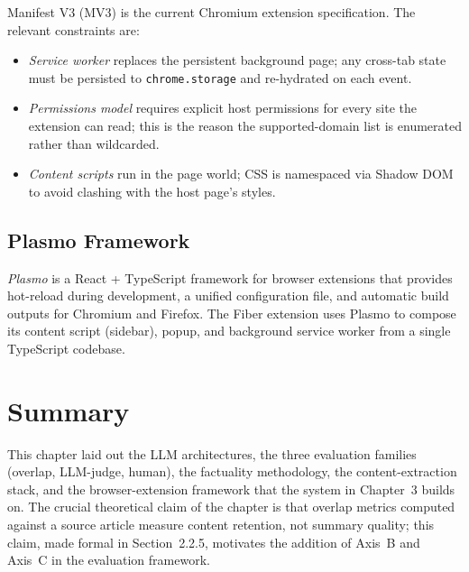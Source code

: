 Manifest V3 (MV3) is the current Chromium extension specification. The
relevant constraints are:

\begin{itemize}
  \item \textit{Service worker} replaces the persistent background page;
        any cross-tab state must be persisted to \texttt{chrome.storage}
        and re-hydrated on each event.
  \item \textit{Permissions model} requires explicit host permissions for
        every site the extension can read; this is the reason the
        supported-domain list is enumerated rather than wildcarded.
  \item \textit{Content scripts} run in the page world; CSS is namespaced
        via Shadow DOM to avoid clashing with the host page's styles.
\end{itemize}

\subsection{Plasmo Framework}

\textit{Plasmo} is a React + TypeScript framework for browser extensions
that provides hot-reload during development, a unified configuration
file, and automatic build outputs for Chromium and Firefox. The Fiber
extension uses Plasmo to compose its content script (sidebar),
popup, and background service worker from a single TypeScript codebase.

\section{Summary}

This chapter laid out the LLM architectures, the three evaluation families
(overlap, LLM-judge, human), the factuality methodology, the
content-extraction stack, and the browser-extension framework that the
system in Chapter~3 builds on. The crucial theoretical claim of the
chapter is that overlap metrics computed against a source article measure
content retention, not summary quality; this claim, made formal in
Section~2.2.5, motivates the addition of Axis~B and Axis~C in the
evaluation framework.
